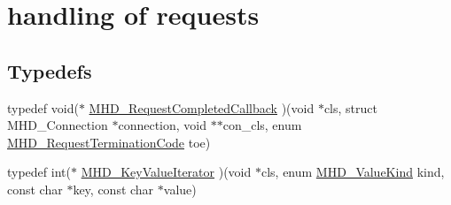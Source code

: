 \hypertarget{group__request}{\section{handling of requests}
\label{group__request}
}
\subsection*{\-Typedefs}
\begin{DoxyCompactItemize}
\item 
typedef void($\ast$ \hyperlink{group__request_gab8cf19682c45b3b5aead1294623a4184}{\-M\-H\-D\-\_\-\-Request\-Completed\-Callback} )(void $\ast$cls, struct \-M\-H\-D\-\_\-\-Connection $\ast$connection, void $\ast$$\ast$con\-\_\-cls, enum \hyperlink{group__request_gadc947d84fa56a9de3c0745b6357d74f7}{\-M\-H\-D\-\_\-\-Request\-Termination\-Code} toe)
\item 
typedef int($\ast$ \hyperlink{group__request_ga4a3cbf233bf4c7ffabeb3e85490ff464}{\-M\-H\-D\-\_\-\-Key\-Value\-Iterator} )(void $\ast$cls, enum \hyperlink{microhttpd_8h_ab5475b4e8aa05a99c49b3ac916cf7a3a}{\-M\-H\-D\-\_\-\-Value\-Kind} kind, const char $\ast$key, const char $\ast$value)
\end{DoxyCompactItemize}
